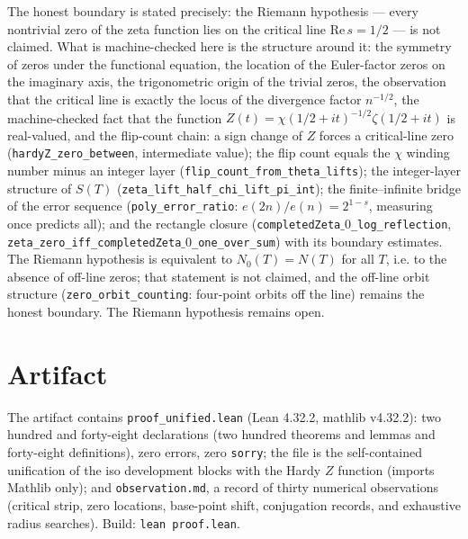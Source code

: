 \documentclass[sigplan,10pt,anonymous,review]{acmart}
\begin{document}
The honest boundary is stated precisely: the Riemann hypothesis ---
every nontrivial zero of the zeta function lies on the critical line
$\mathrm{Re}\,s = 1/2$ --- is not claimed. What is machine-checked
here is the structure around it: the symmetry of zeros under the
functional equation, the location of the Euler-factor zeros on the
imaginary axis, the trigonometric origin of the trivial zeros, the
observation that the critical line is exactly the locus of the
divergence factor $n^{-1/2}$, the machine-checked fact that the
function $Z(t) = \chi(1/2+it)^{-1/2}\zeta(1/2+it)$ is real-valued,
and the flip-count chain: a sign change of $Z$ forces a critical-line
zero (\texttt{hardyZ\_zero\_between}, intermediate value); the flip
count equals the $\chi$ winding number minus an integer layer
(\texttt{flip\_count\_from\_theta\_lifts}); the integer-layer
structure of $S(T)$ (\texttt{zeta\_lift\_half\_chi\_lift\_pi\_int});
the finite--infinite bridge of the error sequence
(\texttt{poly\_error\_ratio}: $e(2n)/e(n) = 2^{1-s}$, measuring
once predicts all); and the rectangle closure
(\texttt{completedZeta$\_0$\_log\_reflection},
\texttt{zeta\_zero\_iff\_completedZeta$\_0$\_one\_over\_sum})
with its boundary estimates. The Riemann hypothesis is equivalent to
$N_0(T) = N(T)$ for all $T$, i.e. to the absence of off-line zeros;
that statement is not claimed, and the off-line orbit structure
(\texttt{zero\_orbit\_counting}: four-point orbits off the line)
remains the honest boundary. The Riemann hypothesis remains open.

\section*{Artifact}

The artifact contains \texttt{proof\_unified.lean} (Lean 4.32.2,
mathlib v4.32.2): two hundred and forty-eight declarations (two
hundred theorems and lemmas and forty-eight definitions), zero errors,
zero \texttt{sorry}; the file is the self-contained unification
of the iso development blocks with the Hardy $Z$ function (imports
Mathlib only); and \texttt{observation.md}, a record of thirty
numerical observations
(critical strip, zero locations, base-point shift, conjugation
records, and exhaustive radius searches). Build:
\texttt{lean proof.lean}.
\end{document}
